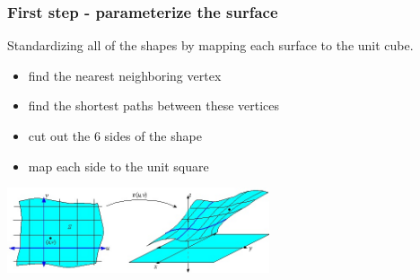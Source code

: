 \documentclass{beamer} %
\theoremstyle{definition} %
\begin{document}
\begin{frame}
\frametitle{First step - parameterize the surface}
Standardizing all of the shapes by mapping each surface to the unit cube.


\begin{itemize}
\item 
 find the nearest neighboring vertex 
 \item
find the shortest paths between these vertices
\item 
 cut out the 6 sides of the shape
\item 
 map each side to the unit square 
\end{itemize}
\begin{center}
\includegraphics[height=2.5cm, ]{../images/param1b.jpg}
\end{center}
\end{frame}
\end{document}
